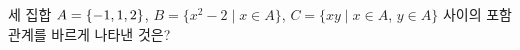 세 집합 $A=\{-1{,}\mkern3mu\mathopen{}1{,}\mkern3mu\mathopen{}2\}$, $B=\{x^2-2 \mid x\in A\}$, $C=\{xy \mid x\in A$, $y\in A\}$ 사이의 포함 관계를 바르게 나타낸 것은?

